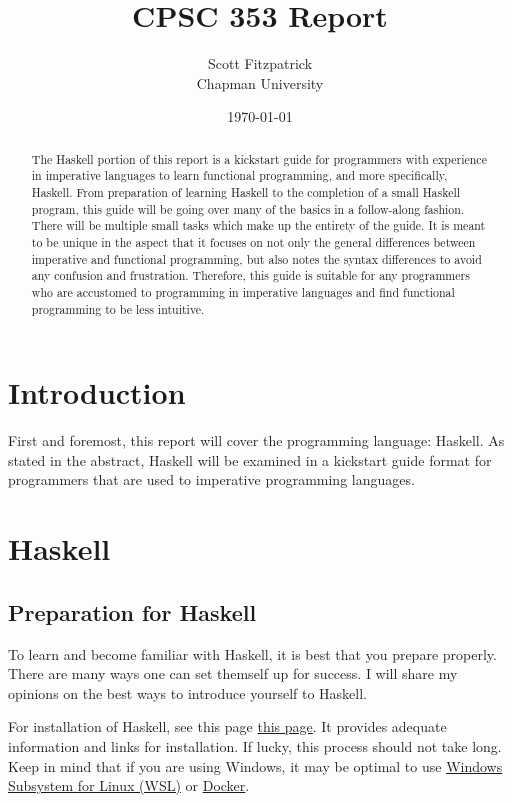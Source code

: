 \documentclass{article}
\title{CPSC 353 Report}
\author{Scott Fitzpatrick  \\ Chapman University}
\date{\today}
\begin{document}
\maketitle

\begin{abstract}
The Haskell portion of this report is a kickstart guide for programmers with experience in imperative languages to learn functional programming, and more specifically, Haskell. From preparation of learning Haskell to the completion of a small Haskell program, this guide will be going over many of the basics in a follow-along fashion. There will be multiple small tasks which make up the entirety of the guide. It is meant to be unique in the aspect that it focuses on not only the general differences between imperative and functional programming, but also notes the syntax differences to avoid any confusion and frustration. Therefore, this guide is suitable for any programmers who are accustomed to programming in imperative languages and find functional programming to be less intuitive.
\end{abstract}

\tableofcontents

\section{Introduction}\label{intro}

First and foremost, this report will cover the programming language: Haskell. As stated in the abstract, Haskell will be examined in a kickstart guide format for programmers that are used to imperative programming languages.

\section{Haskell}\label{haskell}

\subsection{Preparation for Haskell}
\medskip\noindent
To learn and become familiar with Haskell, it is best that you prepare properly. There are many ways one can set themself up for success. I will share my opinions on the best ways to introduce yourself to Haskell.

\medskip\noindent
For installation of Haskell, see this page \href{https://hackmd.io/@alexhkurz/Hk86XnCzD}{this page}. It provides adequate information and links for installation. If lucky, this process should not take long. Keep in mind that if you are using Windows, it may be optimal to use \href{https://docs.microsoft.com/en-us/windows/wsl/install}{Windows Subsystem for Linux (WSL)} or \href{https://www.docker.com/get-started}{Docker}.
\end{document}
